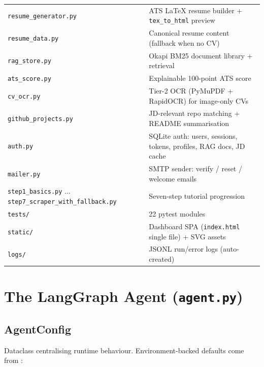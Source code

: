 \documentclass[11pt,a4paper]{article}
\newcommand{\file}[1]{\texttt{\small #1}}
\begin{document}
\begin{center}
\begin{tabular}{@{}lp{9.6cm}@{}}
\file{resume\_generator.py} & ATS \LaTeX{} resume builder +
                               \texttt{tex\_to\_html} preview\\
\file{resume\_data.py} & Canonical resume content (fallback when no CV)\\
\file{rag\_store.py} & Okapi BM25 document library + retrieval\\
\file{ats\_score.py} & Explainable 100-point ATS score\\
\file{cv\_ocr.py} & Tier-2 OCR (PyMuPDF + RapidOCR) for image-only CVs\\
\file{github\_projects.py} & JD-relevant repo matching + README summarisation\\
\file{auth.py} & SQLite auth: users, sessions, tokens, profiles, RAG docs,
                  JD cache\\
\file{mailer.py} & SMTP sender: verify / reset / welcome emails\\
\file{step1\_basics.py} $\ldots$ \file{step7\_scraper\_with\_fallback.py} &
Seven-step tutorial progression\\
\file{tests/} & 22 pytest modules\\
\file{static/} & Dashboard SPA (\file{index.html} single file) + SVG assets\\
\file{logs/} & JSONL run/error logs (auto-created)\\
\bottomrule
\end{tabular}
\end{center}

\section{The LangGraph Agent (\file{agent.py})}
\label{sec:agent}

\subsection{AgentConfig}
Dataclass centralising runtime behaviour. Environment-backed defaults come
from :
\end{document}
